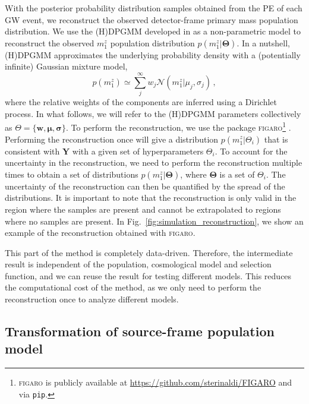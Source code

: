 \documentclass[sn-aps, pdflatex, iicol]{sn-jnl}
\begin{document}
With the posterior probability distribution samples obtained from the \ac{PE} of each \ac{GW} event, we reconstruct the observed detector-frame primary mass population distribution.
We use the \ac{(H)DPGMM} developed in \cite{Rinaldi:2021bhm} as a non-parametric model to reconstruct the observed $m^z_1$ population distribution $p(m^z_1|\mathbf{\Theta})$.
In a nutshell, (H)DPGMM approximates the underlying probability density with a (potentially infinite) Gaussian mixture model,
\begin{equation}
    p(m_1^z) \simeq \sum_j^\infty w_j \mathcal{N}(m_1^z|\mu_j,\sigma_j)\,,
\end{equation}
where the relative weights of the components are inferred using a Dirichlet process. In what follows, we will refer to the (H)DPGMM parameters collectively as $\Theta = \{\mathbf{w},\boldsymbol\mu,\boldsymbol\sigma\}$.
To perform the reconstruction, we use the package \textsc{figaro}\footnote{\textsc{figaro} is publicly available at \url{https://github.com/sterinaldi/FIGARO} and via \texttt{pip}.} \citep{Rinaldi:2024eep}.
Performing the reconstruction once will give a distribution $p(m^z_1|\Theta_i)$ that is consistent with $\mathbf{Y}$ with a given set of hyperparameters $\Theta_i$.
To account for the uncertainty in the reconstruction, we need to perform the reconstruction multiple times to obtain a set of distributions $p(m^z_1|\mathbf{\Theta})$, where $\mathbf{\Theta}$ is a set of $\Theta_i$.
The uncertainty of the reconstruction can then be quantified by the spread of the distributions.
It is important to note that the reconstruction is only valid in the region where the samples are present and cannot be extrapolated to regions where no samples are present.
In Fig.~\ref{fig:simulation_reconstruction}, we show an example of the reconstruction obtained with \textsc{figaro}.

This part of the method is completely data-driven.
Therefore, the intermediate result is independent of the population, cosmological model and selection function, and we can reuse the result for testing different models.
This reduces the computational cost of the method, as we only need to perform the reconstruction once to analyze different models.

\subsection{Transformation of source-frame population model}
\label{sec:transformation}
\end{document}
